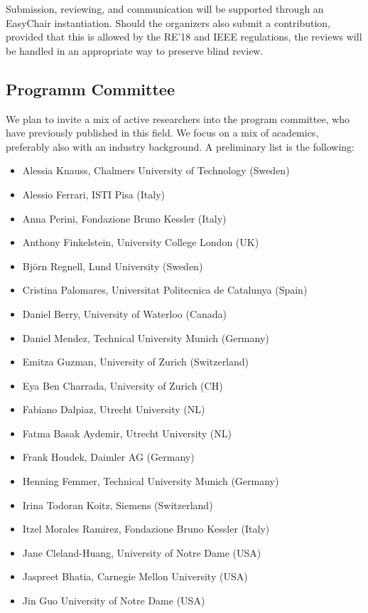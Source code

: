 \documentclass[conference,9pt]{IEEEtran}
\begin{document}
Submission, reviewing, and communication will be supported through an EasyChair instantiation. Should the organizers also submit a contribution, provided that this is allowed by the RE'18 and IEEE regulations, the reviews will be handled in an appropriate way to preserve blind review.

\subsection{Programm Committee}
We plan to invite a mix of active researchers into the program committee, who have previously published in this field. We focus on a mix of academics, preferably also with an industry background. A preliminary list is the following:
\begin{itemize}
  \item Alessia Knauss, Chalmers University of Technology (Sweden)
  \item Alessio Ferrari, ISTI Pisa (Italy)
  \item Anna Perini, Fondazione Bruno Kessler (Italy)
  \item Anthony Finkelstein, University College London (UK)
  \item Bj{\"o}rn Regnell, Lund University (Sweden)
  \item Cristina Palomares, Universitat Politecnica de Catalunya (Spain)
  \item Daniel Berry, University of Waterloo (Canada)
  \item Daniel Mendez, Technical University Munich (Germany)
  \item Emitza Guzman, University of Zurich (Switzerland)
  \item Eya Ben Charrada, University of Zurich (CH)
  \item Fabiano Dalpiaz, Utrecht University (NL)
  \item Fatma Basak Aydemir, Utrecht University (NL)
  \item Frank Houdek, Daimler AG (Germany)
  \item Henning Femmer, Technical University Munich (Germany)
  \item Irina Todoran Koitz, Siemens (Switzerland)
  \item Itzel Morales Ramirez, Fondazione Bruno Kessler (Italy)
  \item Jane Cleland-Huang, University of Notre Dame (USA)
  \item Jaspreet Bhatia, Carnegie Mellon University (USA)
  \item Jin Guo	University of Notre Dame (USA)

\end{itemize}
\end{document}
